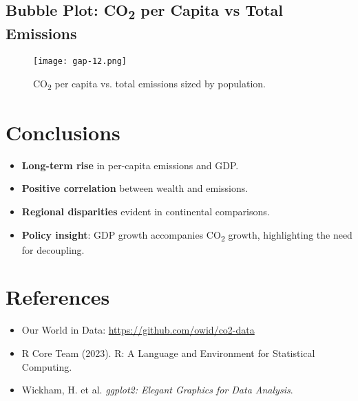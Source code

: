 \documentclass[11pt,a4paper]{article}
\begin{document}
\subsection{Bubble Plot: CO\textsubscript{2} per Capita vs Total Emissions}
\begin{figure}[H]
  \centering
  \texttt{[image: gap-12.png]}
  \caption{CO\textsubscript{2} per capita vs. total emissions sized by population.}
  \label{fig:bubble}
\end{figure}

\section{Conclusions}
\begin{itemize}
  \item \textbf{Long-term rise} in per-capita emissions and GDP.
  \item \textbf{Positive correlation} between wealth and emissions.
  \item \textbf{Regional disparities} evident in continental comparisons.
  \item \textbf{Policy insight}: GDP growth accompanies CO\textsubscript{2} growth, highlighting the need for decoupling.
\end{itemize}

\section*{References}
\begin{itemize}
  \item Our World in Data: \url{https://github.com/owid/co2-data}
  \item R Core Team (2023). R: A Language and Environment for Statistical Computing.
  \item Wickham, H. et al. \emph{ggplot2: Elegant Graphics for Data Analysis}.
\end{itemize}
\end{document}
